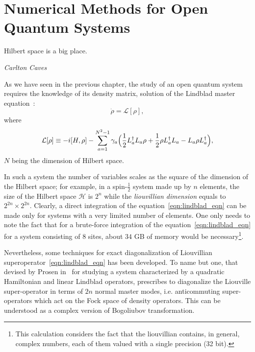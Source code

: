 \chapter{Numerical Methods for Open Quantum Systems}
\label{chapter3}
\epigraph{Hilbert space is a big place.}{\textit{Carlton Caves}}
As we have seen in the previous chapter, the study of an open quantum system requires the knowledge of its density matrix, solution of the Lindblad master equation~\cite{presk:quant_info}:
\begin{equation*}
    \dot{\rho} = \mathcal{L}[\rho],
\end{equation*}
where
\begin{equation}
\label{eqn:lindblad_eqn}
    \mathcal{L}[\rho] \equiv -i[H, \rho] - \sum_{a=1}^{N^2-1}\gamma_a\Bigl(\frac{1}{2}L_a^{\dagger}L_a\rho + \frac{1}{2}\rho L_a^{\dagger}L_a - L_a\rho L_a^{\dagger}\Bigl),
\end{equation}
$N$ being the dimension of Hilbert space.

In such a system the number of variables scales as the square of the dimension of the Hilbert space; for example, in a spin-$\frac{1}{2}$ system made up by $n$ elements, the size of the Hilbert space $\mathcal{H}$ is $2^n$ while the \emph{liouvillian dimension} equals to $2^{2n} \times 2^{2n}$. Clearly, a direct integration of the equation~\ref{eqn:lindblad_eqn} can be made only for systems with a very limited number of elements. One only needs to note the fact that for a brute-force integration of the equation~\ref{eqn:lindblad_eqn} for a system consisting of $8$ sites, about $34$ GB of memory would be necessary\footnote{This calculation considers the fact that the liouvillian contains, in general, complex numbers, each of them valued with a single precision (32 bit).}.

Nevertheless, some techniques for exact diagonalization of Liouvillian superoperator~\ref{eqn:lindblad_eqn} has been developed. To name but one, that devised by Prosen in~\cite{Prosen_2008} for studying a system characterized by a quadratic Hamiltonian and linear Lindblad operators, prescribes to diagonalize the Liouville super-operator in terms of $2n$ normal master modes, i.e. anticommuting super-operators which act on the Fock space of density operators. This can be understood as a complex version of Bogoliubov transformation.


